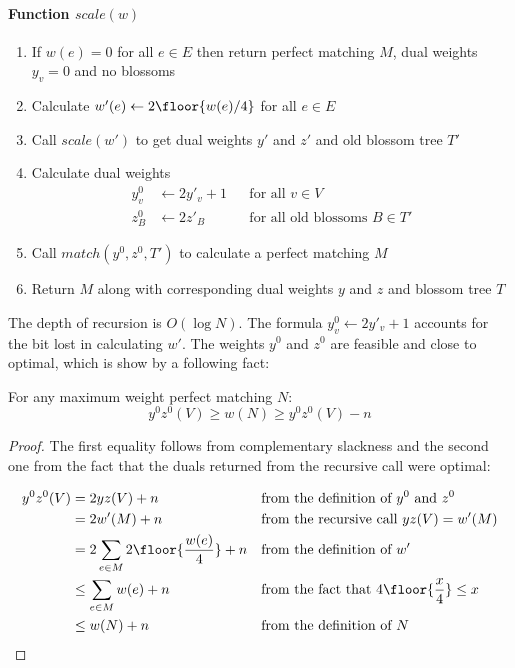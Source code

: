 \renewcommand{\labelenumi}{\textbf{\arabic{enumi}}.}
\paragraph*{Function $scale(w)$}
\begin{enumerate}
    \item If $w(e) = 0$ for all $e \in E$ then return perfect matching $M$, dual weights $y_v = 0$ and no blossoms
    \item Calculate $w'(e) \gets 2\floor{ w(e)/4 }$ for all $e \in E$
    \item Call $scale(w')$ to get dual weights $y'$ and $z'$ and old blossom tree $T'$
    \item Calculate dual weights
    \begin{align*}
        y^0_v &\gets 2y'_v + 1 && \text{for all $v \in V$} \\
        z^0_B &\gets 2z'_B && \text{for all old blossoms $B \in T'$}
    \end{align*}
    \item Call $match(y^0, z^0, T')$ to calculate a perfect matching $M$
    \item Return $M$ along with corresponding dual weights $y$ and $z$ and blossom tree $T$
\end{enumerate}

The depth of recursion is $O(\log N)$. The formula $y^0_v \gets 2y'_v + 1$ accounts for the bit lost in calculating $w'$. The weights $y^0$ and $z^0$ are feasible and close to optimal, which is show by a following fact:

\begin{theorem}
    For any maximum weight perfect matching $N$:
    \begin{equation}\label{eq:3}
        y^0z^0(V) \geq w(N) \geq y^0z^0(V) - n
    \end{equation}    
\end{theorem}

\begin{proof}
    The first equality follows from complementary slackness and the second one from the fact that the duals returned from the recursive call were optimal:

    \begin{align*}
        y^0z^0(V) &= 2yz(V) + n && \text{from the definition of $y^0$ and $z^0$}\\
        &= 2w'(M) + n && \text{from the recursive call $yz(V) = w'(M)$} \\
        &= 2 \sum_{e \in M} 2 \floor{\frac{w(e)}{4}} + n && \text{from the definition of $w'$} \\
        &\leq \sum_{e \in M} w(e) + n && \text{from the fact that $4\floor{\frac{x}{4}} \leq x$} \\
        &\leq w(N) + n  && \text{from the definition of $N$} \\
    \end{align*}    
\end{proof}

